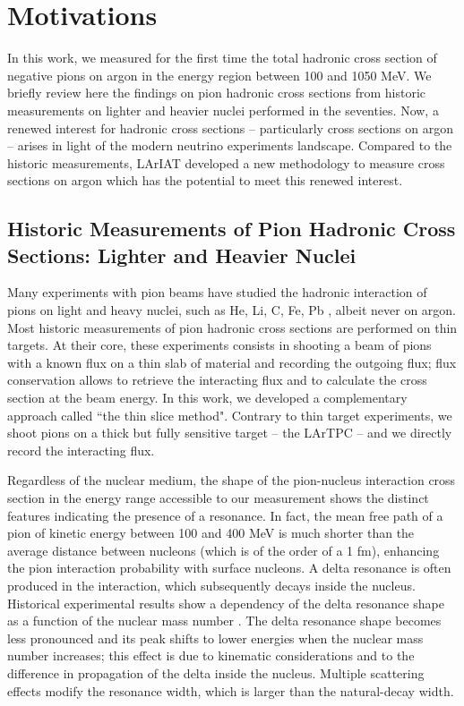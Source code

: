 \documentclass[aps,prl,twocolumn,showpacs,superscriptaddress,groupedaddress]{revtex4}  %
\begin{document}
\newpage
\section{\label{sec:Motivations}Motivations}
In this work, we measured  for the first time the total hadronic cross section of negative pions on argon in the energy region between 100 and 1050 MeV. We briefly review here the findings on pion hadronic cross sections from historic measurements on lighter and heavier nuclei performed in the seventies.  Now, a renewed interest for hadronic cross sections -- particularly cross sections on argon -- arises in light of the modern neutrino experiments landscape. Compared to the historic measurements, LArIAT developed a new  methodology to measure cross sections on argon which has the potential to meet this renewed interest. 

\subsection{Historic Measurements of Pion Hadronic Cross Sections: Lighter and Heavier Nuclei}
Many experiments with pion beams have studied the hadronic interaction of pions on light and heavy nuclei, such as  He, Li, C, Fe, Pb \cite{Wilkin:1973xd, Clough1974,PhysRevC.14.635}, albeit never on argon.  Most historic measurements of pion hadronic cross sections are performed on thin targets. At their core, these experiments consists in shooting a beam of pions with a known flux on a thin slab of material and recording the outgoing flux; flux conservation allows to retrieve the interacting flux and to calculate the cross section at the beam energy.
In this work, we developed a complementary approach called ``the thin slice method". Contrary to thin target experiments, we shoot pions on a thick but fully sensitive target  -- the LArTPC -- and we directly record the interacting flux. 

Regardless of the nuclear medium, the shape of the pion-nucleus interaction cross section in the energy range accessible to our measurement shows the distinct features indicating the presence of a resonance. In fact, the mean free path of a pion of kinetic energy between 100 and 400 MeV is much shorter than the average distance between nucleons (which is of the order of a
 1 fm),   enhancing the pion interaction probability with surface nucleons. A delta resonance is often produced in the interaction, which subsequently decays inside the nucleus.
Historical experimental results show a dependency of the delta resonance shape as a function of the nuclear mass number \cite{PhysRevC.14.635}. The delta resonance shape becomes less pronounced  
and its peak shifts to lower energies when the nuclear mass number increases; this effect is due to kinematic considerations and to the difference in propagation of the delta inside the nucleus. Multiple scattering effects modify the resonance width, which is larger than the natural-decay width.
\end{document}
